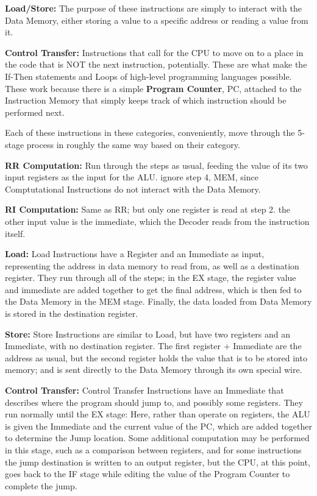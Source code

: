 \documentclass[12pt,twoside]{reedthesis}
\begin{document}
\textbf{Load/Store:} The purpose of these instructions are simply to interact with the Data Memory, either storing a value to a specific address or reading a value from it.

\textbf{Control Transfer:} Instructions that call for the CPU to move on to a place in the code that is NOT the next instruction, potentially. These are what make the If-Then statements and Loops of high-level programming languages possible. These work because there is a simple \textbf{Program Counter}, PC, attached to the Instruction Memory that simply keeps track of which instruction should be performed next.

Each of these instructions in these categories, conveniently, move through the 5-stage process in roughly the same way based on their category.

\textbf{RR Computation:} Run through the steps as usual, feeding the value of its two input registers as the input for the ALU. ignore step 4, MEM, since Comptutational Instructions do not interact with the Data Memory.

\textbf{RI Computation:} Same as RR; but only one register is read at step 2. the other input value is the immediate, which the Decoder reads from the instruction itself.

\textbf{Load:} Load Instructions have a Register and an Immediate as input, representing the address in data memory to read from, as well as a destination register. They run through all of the steps; in the EX stage, the register value and immediate are added together to get the final address, which is then fed to the Data Memory in the MEM stage. Finally, the data loaded from Data Memory is stored in the destination register.

\textbf{Store:} Store Instructions are similar to Load, but have two registers and an Immediate, with no destination register. The first register + Immediate are the address as usual, but the second register holds the value that is to be stored into memory; and is sent directly to the Data Memory through its own special wire.

\textbf{Control Transfer:} Control Transfer Instructions have an Immediate that describes where the program should jump to, and possibly some registers. They run normally until the EX stage: Here, rather than operate on registers, the ALU is given the Immediate and the current value of the PC, which are added together to determine the Jump location. Some additional computation may be performed in this stage, such as a comparison between registers, and for some instructions the jump destination is written to an output register, but the CPU, at this point, goes back to the IF stage while editing the value of the Program Counter to complete the jump.
\end{document}
